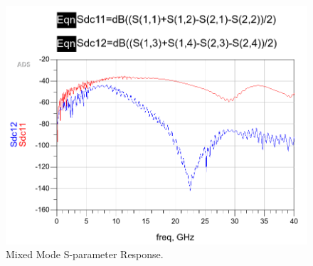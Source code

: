 \documentclass{book}  %
\begin{document}
\begin{paper}
\begin{figure}[htbp!]
\begin{minipage}[b]{0.5\linewidth}
		\includegraphics[width=\textwidth]{./img/S-parameter/mixed.png}
	\end{minipage}
	\caption{Mixed Mode S-parameter Response.}	
	\label{fig:Mixed Mode S-parameter Response}
\end{figure}


\end{paper}
\end{document}
